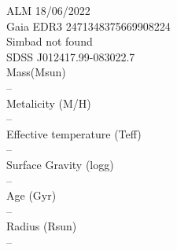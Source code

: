 ALM 18/06/2022\\
Gaia EDR3 2471348375669908224\\
Simbad not found\\
SDSS J012417.99-083022.7\\
Mass(Msun)\\
--\\
Metalicity (M/H)\\
--\\
Effective temperature (Teff) \\
--\\
Surface Gravity (logg) \\
--\\
Age (Gyr)\\
--\\
Radius (Rsun)\\
--\\

